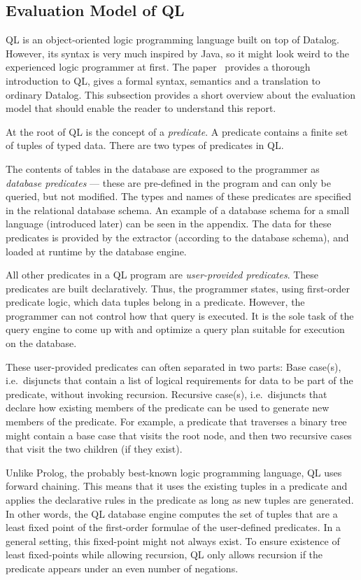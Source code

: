 \subsection{Evaluation Model of QL}
QL is an object-oriented logic programming language built on top of Datalog.
However, its syntax is very much inspired by Java, so it might look weird to the 
experienced logic programmer at first.
The paper~\cite{qlpaper} provides a thorough introduction to QL, gives a 
formal syntax, semantics and a translation to ordinary Datalog.
This subsection provides a short overview about the evaluation model that should
enable the reader to understand this report.

At the root of QL is the concept of a \emph{predicate}.
A predicate contains a finite set of tuples of typed data.
There are two types of predicates in QL.

The contents of tables in the database are exposed to the programmer as \emph{database 
predicates} --- these are pre-defined in the program and can only be queried, but not modified.
The types and names of these predicates are specified in the relational database schema.
An example of a database schema for a small language (introduced later) can be 
seen in the appendix.
The data for these predicates is provided by the extractor (according to the database schema),
and loaded at runtime by the database engine.

All other predicates in a QL program are \emph{user-provided predicates}.
These predicates are built declaratively.
Thus, the programmer states, using first-order predicate logic,
which data tuples belong in a predicate.
However, the programmer can not control how that query is executed.
It is the sole task of the query engine to come up with and optimize a 
query plan suitable for execution on the database.

These user-provided predicates can often separated in two parts:
Base case(s), i.e.\ disjuncts that contain a list of logical requirements for data 
to be part of the predicate, without invoking recursion.
Recursive case(s), i.e.\ disjuncts that declare how existing members of the predicate 
can be used to generate new members of the predicate.
For example, a predicate that traverses a binary tree might contain a base case that visits 
the root node, and then two recursive cases that visit the two children (if they exist).

Unlike Prolog, the probably best-known logic programming language, QL uses forward 
chaining.
This means that it uses the existing tuples in a predicate and applies the declarative
rules in the predicate as long as new tuples are generated.
In other words, the QL database engine computes the set of tuples that are a least fixed point 
of the first-order formulae of the user-defined predicates.
In a general setting, this fixed-point might not always exist.
To ensure existence of least fixed-points while allowing recursion,
QL only allows recursion if the predicate appears under an even number of negations.


